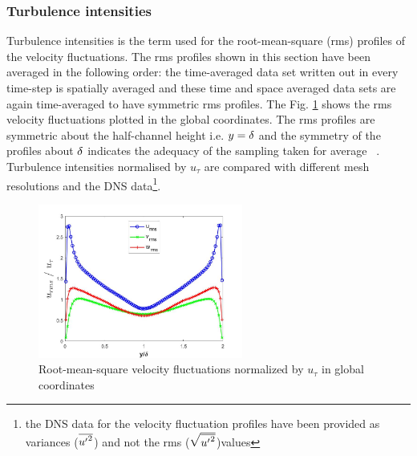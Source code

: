 %
%

\subsubsection{Turbulence intensities} \label{Turbulence intensities UDNS}
Turbulence intensities is the term used for the root-mean-square (rms) profiles of the velocity fluctuations. The rms profiles shown in this section have been averaged in the following order: 
the time-averaged data set written out in every time-step is spatially averaged and these time and space averaged data sets are again time-averaged to have symmetric rms profiles. The Fig. \ref{Turbulence intensities} shows the rms velocity fluctuations plotted in the global coordinates. The rms profiles are symmetric about the half-channel height i.e. $y = \delta$ and the symmetry of the profiles about $\delta$ indicates the adequacy of the sampling taken for average ~\cite{kim:moin:moser:87}. Turbulence intensities normalised by $u_\tau$ are compared with different mesh resolutions and the DNS data\footnote{the DNS data for the velocity fluctuation profiles have been provided as variances ($\overline{{{u}^\prime}^2}$) and not the rms ($\sqrt{\overline{{{u}^\prime}^2}}$)values}. 
%
\begin{figure}[h!]
    \centering
    \includegraphics[width=0.6\textwidth]{06_Resultsanddiscussion/figur/UDNS_2016/Turbulence ontensities_Mesh2.jpg}
    \caption{Root-mean-square velocity fluctuations normalized by $u_\tau$ in global coordinates}
    \label{Turbulence intensities}
\end{figure}
%

